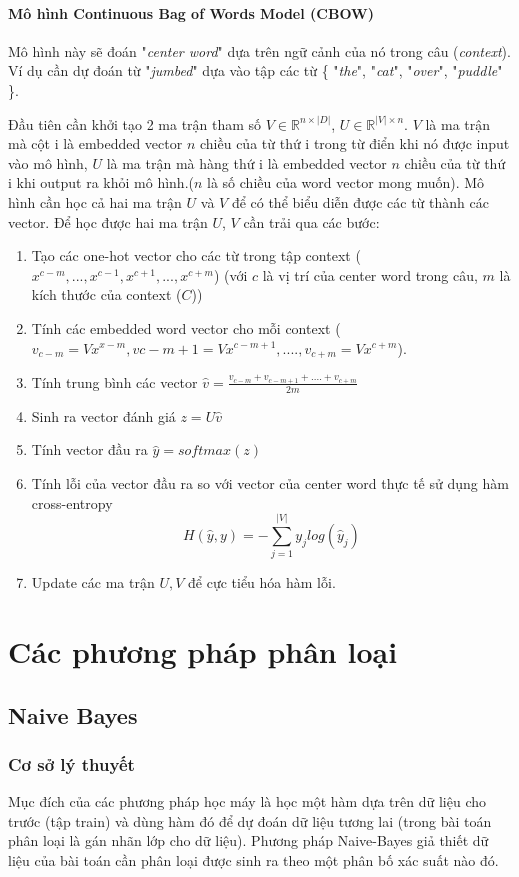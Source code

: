 \documentclass[a4paper,12pt]{report}
\begin{document}
\subsubsection{Mô hình Continuous Bag of Words Model (CBOW)}
Mô hình này sẽ đoán "\emph{center word}" dựa trên ngữ cảnh của nó trong câu (\emph{context}). Ví dụ cần dự đoán từ "\emph{jumbed}" dựa vào tập các từ \{ "\emph{the}", "\emph{cat}", "\emph{over}", "\emph{puddle}" \}.
\par Đầu tiên cần khởi tạo 2 ma trận tham số $V \in \mathbb{R}^{n \times |D|}$, $U \in \mathbb{R}^{|V| \times n}$. $V$ là ma trận mà cột i là embedded vector $n$ chiều của từ thứ i trong từ điển khi nó được input vào mô hình, $U$ là ma trận mà hàng thứ i là embedded vector $n$ chiều của từ thứ i khi output ra khỏi mô hình.($n$ là số chiều của word vector mong muốn). Mô hình cần học cả hai ma trận $U$ và $V$ để có thể biểu diễn được các từ thành các vector. Để học được hai ma trận $U$, $V$ cần trải qua các bước: 
\begin{enumerate}
\item Tạo các one-hot vector cho các từ trong tập context ($x^{c-m}, ..., x^{c-1}, x^{c+1}, ..., x^{c+m}$) (với $c$ là vị trí của center word trong câu, $m$ là kích thước của context ($C$))
\item Tính các embedded word vector cho mỗi context ($v_{c-m} = Vx^{x-m}, v{c-m+1} = Vx^{c-m+1}, ...., v_{c+m} = Vx^{c+m}$).
\item Tính trung bình các vector $\hat{v} = \frac{v_{c-m} + v_{c-m+1} + .... + v_{c+m}}{2m}$
\item Sinh ra vector đánh giá $z = U\hat{v}$
\item Tính vector đầu ra $\hat{y} = softmax(z)$
\item Tính lỗi của vector đầu ra so với vector của center word thực tế sử dụng hàm cross-entropy
$$H(\hat{y},y) = -\sum_{j=1}^{|V|} y_jlog(\hat{y}_j)$$
\item Update các ma trận $U, V$ để cực tiểu hóa hàm lỗi.
\end{enumerate}


\chapter{Các phương pháp phân loại}
\section{Naive Bayes}
\subsection{Cơ sở lý thuyết}
Mục đích của các phương pháp học máy là học một hàm dựa trên dữ liệu cho trước (tập train) và dùng hàm đó để dự đoán dữ liệu tương lai (trong bài toán phân loại là gán nhãn lớp cho dữ liệu). Phương pháp Naive-Bayes giả thiết dữ liệu của bài toán cần phân loại được sinh ra theo một phân bố xác suất nào đó. 
\end{document}
